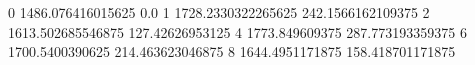 0 1486.076416015625 0.0
1 1728.2330322265625 242.1566162109375
2 1613.502685546875 127.42626953125
4 1773.849609375 287.773193359375
6 1700.5400390625 214.463623046875
8 1644.4951171875 158.418701171875
